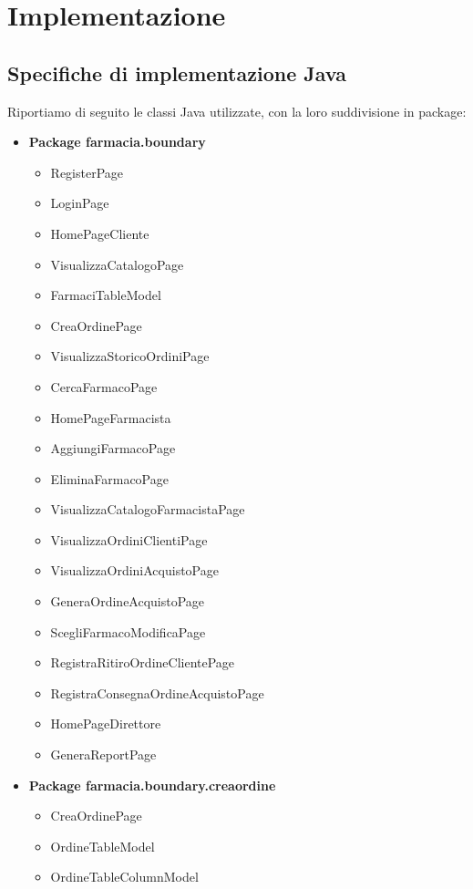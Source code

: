 \chapter{Implementazione}

\section{Specifiche di implementazione Java}

Riportiamo di seguito le classi Java utilizzate, con la loro suddivisione in package:

\begin{itemize}
	\item \textbf{Package farmacia.boundary}
	\begin{itemize}
		\item RegisterPage
		\item LoginPage
		\item HomePageCliente
		\item VisualizzaCatalogoPage
		\item FarmaciTableModel
		\item CreaOrdinePage
		\item VisualizzaStoricoOrdiniPage
		\item CercaFarmacoPage
		\item HomePageFarmacista
		\item AggiungiFarmacoPage
		\item EliminaFarmacoPage
		\item VisualizzaCatalogoFarmacistaPage
		\item VisualizzaOrdiniClientiPage
		\item VisualizzaOrdiniAcquistoPage
		\item GeneraOrdineAcquistoPage
		\item ScegliFarmacoModificaPage
		\item RegistraRitiroOrdineClientePage
		\item RegistraConsegnaOrdineAcquistoPage
		\item HomePageDirettore
		\item GeneraReportPage
	\end{itemize}
	\item \textbf{Package farmacia.boundary.creaordine}
	\begin{itemize}
		\item CreaOrdinePage
		\item OrdineTableModel
		\item OrdineTableColumnModel

\end{itemize}
\end{itemize}
